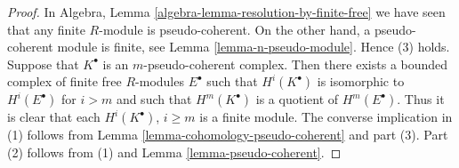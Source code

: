\documentclass[10pt,a4paper]{amsart}
\theoremstyle{plain}
\theoremstyle{definition}
\theoremstyle{remark}
\numberwithin{equation}{subsection}
\begin{document}
\begin{proof}
In
Algebra, Lemma \ref{algebra-lemma-resolution-by-finite-free}
we have seen that any finite $R$-module is pseudo-coherent.
On the other hand, a pseudo-coherent module is finite, see
Lemma \ref{lemma-n-pseudo-module}.
Hence (3) holds. Suppose that $K^\bullet$ is an $m$-pseudo-coherent complex.
Then there exists a bounded complex of finite free $R$-modules $E^\bullet$
such that $H^i(K^\bullet)$ is isomorphic to $H^i(E^\bullet)$ for
$i > m$ and such that $H^m(K^\bullet)$ is a quotient of $H^m(E^\bullet)$.
Thus it is clear that each $H^i(K^\bullet)$, $i \geq m$ is a finite module.
The converse implication in (1) follows from
Lemma \ref{lemma-cohomology-pseudo-coherent}
and part (3).
Part (2) follows from (1) and
Lemma \ref{lemma-pseudo-coherent}.
\end{proof}
\end{document}
